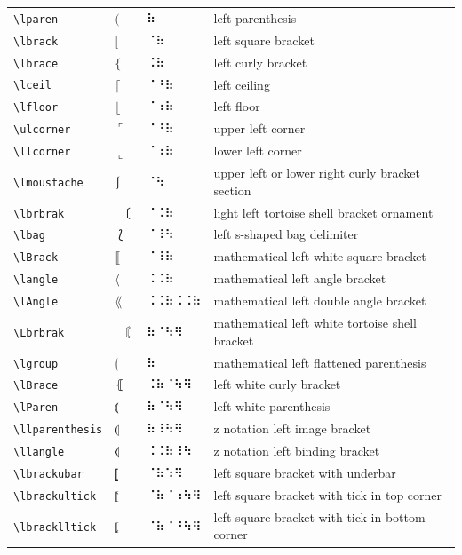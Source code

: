 \documentclass[oneside]{article}
\begin{document}
\begin{longtable}{llll}
\verb|\lparen| & $\lparen$ &  ⠷  & {left parenthesis} \\[2ex]
\verb|\lbrack| & $\lbrack$ &  ⠈⠷  & {left square bracket} \\[2ex]
\verb|\lbrace| & $\lbrace$ &  ⠨⠷  & {left curly bracket} \\[2ex]
\verb|\lceil| & $\lceil$ &  ⠈⠘⠷  & {left ceiling} \\[2ex]
\verb|\lfloor| & $\lfloor$ &  ⠈⠰⠷  & {left floor} \\[2ex]
\verb|\ulcorner| & $\ulcorner$ &  ⠈⠘⠷  & {upper left corner} \\[2ex]
\verb|\llcorner| & $\llcorner$ &  ⠈⠰⠷  & {lower left corner} \\[2ex]
\verb|\lmoustache| & $\lmoustache$ &  ⠈⠳  & {upper left or lower right curly bracket section} \\[2ex]
\verb|\lbrbrak| & $\lbrbrak$ &  ⠈⠨⠷  & {light left tortoise shell bracket ornament} \\[2ex]
\verb|\lbag| & $\lbag$ &  ⠈⠸⠳  & {left s-shaped bag delimiter} \\[2ex]
\verb|\lBrack| & $\lBrack$ &  ⠈⠸⠷  & {mathematical left white square bracket} \\[2ex]
\verb|\langle| & $\langle$ &  ⠨⠨⠷  & {mathematical left angle bracket} \\[2ex]
\verb|\lAngle| & $\lAngle$ &  ⠨⠨⠷⠨⠨⠷  & {mathematical left double angle bracket} \\[2ex]
\verb|\Lbrbrak| & $\Lbrbrak$ &  ⠷⠈⠳⠻  & {mathematical left white tortoise shell bracket} \\[2ex]
\verb|\lgroup| & $\lgroup$ &  ⠷  & {mathematical left flattened parenthesis} \\[2ex]
\verb|\lBrace| & $\lBrace$ &  ⠨⠷⠈⠳⠻  & {left white curly bracket} \\[2ex]
\verb|\lParen| & $\lParen$ &  ⠷⠈⠳⠻  & {left white parenthesis} \\[2ex]
\verb|\llparenthesis| & $\llparenthesis$ &  ⠷⠸⠳⠻  & {z notation left image bracket} \\[2ex]
\verb|\llangle| & $\llangle$ &  ⠨⠨⠷⠸⠳  & {z notation left binding bracket} \\[2ex]
\verb|\lbrackubar| & $\lbrackubar$ &  ⠈⠷⠱⠻  & {left square bracket with underbar} \\[2ex]
\verb|\lbrackultick| & $\lbrackultick$ &  ⠈⠷⠈⠰⠳⠻  & {left square bracket with tick in top corner} \\[2ex]
\verb|\lbracklltick| & $\lbracklltick$ &  ⠈⠷⠈⠘⠳⠻  & {left square bracket with tick in bottom corner} \\[2ex]

\end{longtable}
\end{document}
